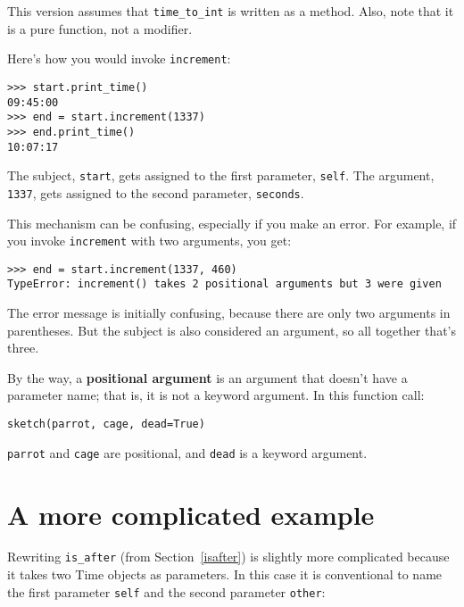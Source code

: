 %
This version assumes that \verb"time_to_int" is written
as a method.  Also, note that
it is a pure function, not a modifier.

Here's how you would invoke {\tt increment}:

\begin{lstlisting}
>>> start.print_time()
09:45:00
>>> end = start.increment(1337)
>>> end.print_time()
10:07:17
\end{lstlisting}

%
The subject, {\tt start}, gets assigned to the first parameter,
{\tt self}.  The argument, {\tt 1337}, gets assigned to the
second parameter, {\tt seconds}.

This mechanism can be confusing, especially if you make an error.
For example, if you invoke {\tt increment} with two arguments, you
get:

\begin{lstlisting}
>>> end = start.increment(1337, 460)
TypeError: increment() takes 2 positional arguments but 3 were given
\end{lstlisting}

%
The error message is initially confusing, because there are
only two arguments in parentheses.  But the subject is also
considered an argument, so all together that's three.

By the way, a {\bf positional argument} is an argument that
doesn't have a parameter name; that is, it is not a keyword
argument.  In this function call:

\begin{lstlisting}
sketch(parrot, cage, dead=True)
\end{lstlisting}

{\tt parrot} and {\tt cage} are positional, and {\tt dead} is
a keyword argument.


\section{A more complicated example}

Rewriting \verb"is_after" (from Section~\ref{isafter}) is slightly
more complicated because it takes two Time objects as parameters.  In
this case it is conventional to name the first parameter {\tt self}
and the second parameter {\tt other}: 

